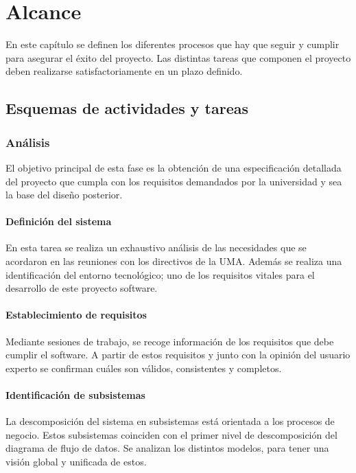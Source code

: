 \documentclass[11pt,a4paper,spanish,twoside]{book}
\begin{document}
\tableofcontents
\listoffigures
\listoftables

\chapter{Alcance}
En este capítulo se definen los diferentes procesos que hay que seguir y
cumplir para asegurar el éxito del proyecto. Las distintas tareas que
componen el proyecto deben realizarse satisfactoriamente en un plazo
definido.

\section{Esquemas de actividades y tareas}

\subsection{Análisis}
El objetivo principal de esta fase es la obtención de una especificación
detallada del proyecto que cumpla con los requisitos demandados por la 
universidad y sea la base del diseño posterior.

\subsubsection{Definición del sistema}
En esta tarea se realiza un exhaustivo análisis de las necesidades que se
acordaron en las reuniones con los directivos de la UMA. Además se realiza una
identificación del entorno tecnológico; uno de los requisitos vitales para el
desarrollo de este proyecto software.

\subsubsection{Establecimiento de requisitos}
Mediante sesiones de trabajo, se recoge información de los requisitos que debe
cumplir el software. A partir de estos requisitos y junto con la opinión del 
usuario experto se confirman cuáles son válidos, consistentes y completos.

\subsubsection{Identificación de subsistemas}
La descomposición del sistema en subsistemas está orientada a los procesos de
negocio. Estos subsistemas coinciden con el primer nivel de descomposición
del diagrama de flujo de datos. Se analizan los distintos modelos, para tener
una visión global y unificada de estos.
\end{document}
